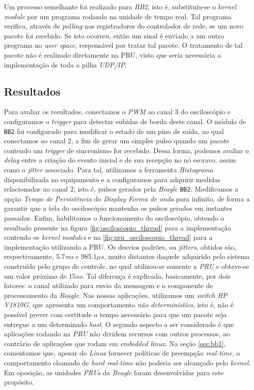 \vspace{12pt}

Um processo semelhante foi realizado para \textit{BB2}, isto é, substituiu-se o
\textit{kernel module} por um programa rodando na unidade de tempo real. Tal
programa verifica, através de \textit{polling} nos registradores do controlador
de rede, se um novo pacote foi recebido. Se isto ocorreu, então um sinal é
enviado a um outro programa no \textit{user space}, responsável por tratar tal
pacote. O tratamento de tal pacote não é realizado diretamente na PRU, visto que
seria necessária a implementação de toda a pilha \textit{UDP/IP}.

\subsection {Resultados}

Para avaliar os resultados, conectamos o \textit{PWM} ao canal 3 do osciloscópio
e configuramos o \textit{trigger} para detectar subidas de borda deste canal. O
módulo de \texttt{BB2} foi configurado para modificar o estado de um pino de
saída, ao qual conectamos ao canal 2, a fim de gerar um simples pulso quando um
pacote contendo um \textit{trigger} de sincronismo for recebido. Dessa forma,
podemos avaliar o \textit{delay} entre a criação do evento inicial e de sua
recepção no nó escravo, assim como o \textit{jitter} associado. Para tal,
utilizamos a ferramenta \textit{Histograma} disponibilizada no equipamento e a
configuramos para adquirir medidas relacionadas ao canal 2, isto é, pulsos
gerados pela \textit{Beagle} \texttt{BB2}. Modificamos a opção \textit{Tempo de
Persistência} do \textit{Display Forma de onda} para infinito, de forma a
garantir que a tela do osciloscópio mantenha os pulsos gerados em instantes
passados. Enfim, habilitamos o funcionamento do osciloscópio, obtendo o
resultado presente na figura \ref{fig:osciloscopio_thread} para a implementação
contendo os \textit{kernel modules} e na \ref{fig:pru_osciloscopio_thread} para
a implementação utilizando a PRU. Os desvios padrões, ou \textit{jitters},
obtidos são, respectivamente, 5.7\textit{ms} e 985.1\(\mu s\), muito distantes
daquele adquirido pelo sistema construído pelo grupo de controle, no qual
utilizou-se somente a \textit{PRU} e obteve-se um valor próximo de
15\textit{ns}. Tal diferença é explicada, basicamente, por dois fatores: o canal
utilizado para envio da mensagem e o componente de processamento da
\textit{Beagle}. Nas nossas aplicações, utilizamos um \textit{switch HP V1810G},
que apresenta um comportamento \textit{não determinístico}, isto é, não é
possível prever com certitude o tempo necessário para que um pacote seja
entregue a um determinado \textit{host}. O segundo aspecto a ser considerado é
que aplicações rodando na \textit{PRU} não dividem recursos com outros
processos, ao contrário de aplicações que rodam em \textit{embedded linux}. Na
seção \ref{sec:bb1}, comentamos que, apesar do \textit{Linux} fornecer políticas
de preempção \textit{real-time}, o comportamento chamado de \textit{hard
real-time} não poderia ser alcançado pelo \textit{kernel}. Em oposição, as
unidades \textit{PRUs} da \textit{Beagle} foram desenvolvidas para este
propósito.

